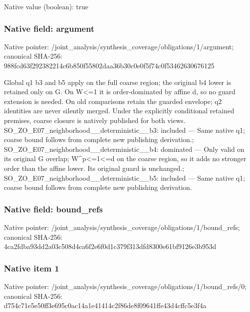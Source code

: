 \documentclass[10pt,a4paper]{article}
\begin{document}
Native value (boolean): true

\subsubsection{Native field: argument}
Native pointer: /joint\_\allowbreak{}analysis/synthesis\_\allowbreak{}coverage/obligations/1/argument; canonical SHA-256: 988fcd63f292382214c6b850f55802daa36b30c0e0f5f74c0f53462630676125

\begingroup\raggedright\sloppy Global q1 b3 and b5 apply on the full coarse region;\allowbreak{} the original b4 lower is retained only on G. On W<=\allowbreak{}1 it is order-dominated by affine d,\allowbreak{} so no guard extension is needed. On old comparisons retain the guarded envelope;\allowbreak{} q2 identities are never silently merged. Under the explicitly conditional retained premises,\allowbreak{} coarse closure is natively published for both views. SO\_\allowbreak{}ZO\_\allowbreak{}E07\_\allowbreak{}neighborhood\_\allowbreak{}\_\allowbreak{}deterministic\_\allowbreak{}\_\allowbreak{}b3:\allowbreak{} included {\AtlasUnicodeText —}\allowbreak{} Same native q1;\allowbreak{} coarse bound follows from complete new publishing derivation.;\allowbreak{} SO\_\allowbreak{}ZO\_\allowbreak{}E07\_\allowbreak{}neighborhood\_\allowbreak{}\_\allowbreak{}deterministic\_\allowbreak{}\_\allowbreak{}b4:\allowbreak{} dominated {\AtlasUnicodeText —}\allowbreak{} Only valid on its original G overlap;\allowbreak{} W\textasciicircum{}p<=\allowbreak{}1<=\allowbreak{}d on the coarse region,\allowbreak{} so it adds no stronger order than the affine lower. Its original guard is unchanged.;\allowbreak{} SO\_\allowbreak{}ZO\_\allowbreak{}E07\_\allowbreak{}neighborhood\_\allowbreak{}\_\allowbreak{}deterministic\_\allowbreak{}\_\allowbreak{}b5:\allowbreak{} included {\AtlasUnicodeText —}\allowbreak{} Same native q1;\allowbreak{} coarse bound follows from complete new publishing derivation.\par\endgroup

\subsubsection{Native field: bound\_\allowbreak{}refs}
Native pointer: /joint\_\allowbreak{}analysis/synthesis\_\allowbreak{}coverage/obligations/1/bound\_\allowbreak{}refs; canonical SHA-256: 4ca2fdba93dd2a03c508d4ca6f2e6f0d1c379f313dfd8300e61bf9126e3b953d

\subsubsection{Native item 1}
Native pointer: /joint\_\allowbreak{}analysis/synthesis\_\allowbreak{}coverage/obligations/1/bound\_\allowbreak{}refs/0; canonical SHA-256: d754c71e5e50ff3e695c0ac14a1e41414c2f86de8f09641ffe43d4cffc5e3f4a
\end{document}
